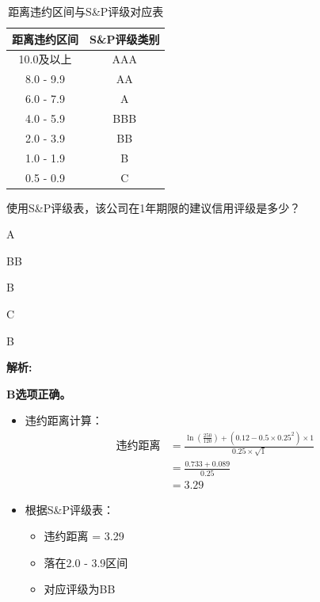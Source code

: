 \documentclass{article}
\newcounter{question} %
\newenvironment{explanation}
{\textbf{解析:}\par}
{\par}
\begin{document}
\begin{question}
    \begin{table}[H]
        \centering
        \renewcommand{\arraystretch}{1.2}
        \begin{tabular}{|c|c|}
            \hline
            \textbf{距离违约区间} & \textbf{S\&P评级类别} \\
            \hline
            10.0及以上 & AAA \\
            \hline
            8.0 - 9.9 & AA \\
            \hline
            6.0 - 7.9 & A \\
            \hline
            4.0 - 5.9 & BBB \\
            \hline
            2.0 - 3.9 & BB \\
            \hline
            1.0 - 1.9 & B \\
            \hline
            0.5 - 0.9 & C \\
            \hline
        \end{tabular}
        \caption{距离违约区间与S\&P评级对应表}
    \end{table}

    使用S\&P评级表，该公司在1年期限的建议信用评级是多少？
\end{question}

\begin{choices}
    \item A
    \item BB
    \item B
    \item C
\end{choices}

\begin{correctanswer}
    B
\end{correctanswer}

\begin{explanation}
   
    \textbf{B选项正确。}
    \begin{itemize}
        \item 违约距离计算：
        \[
        \begin{aligned}
        \text{违约距离} &= \frac{\ln\left(\frac{250}{120}\right) + (0.12 - 0.5 \times 0.25^2) \times 1}{0.25 \times \sqrt{1}} \\
        &= \frac{0.733 + 0.089}{0.25} \\
        &= 3.29
        \end{aligned}
        \]
        \item 根据S\&P评级表：
        \begin{itemize}
            \item 违约距离 = 3.29
            \item 落在2.0 - 3.9区间
            \item 对应评级为BB
        \end{itemize}
    \end{itemize}
    
 
\end{explanation}
\end{document}
